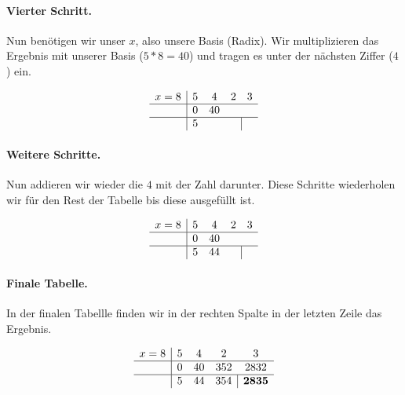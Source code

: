 \documentclass{article}
\begin{document}
\paragraph{Vierter Schritt.}

Nun benötigen wir unser $x$, also unsere Basis (Radix).
Wir multiplizieren das Ergebnis mit unserer Basis ($5 * 8 = 40$) und tragen es unter der nächsten Ziffer ($4$) ein.

\begin{align*}
    \begin{array}{c|cccc}
        x=8 & 5 & 4  & 2                     & 3 \\ \hline
            & 0 & 40 &                       &   \\ \hline
            & 5 &    & \multicolumn{1}{c|}{} &
    \end{array}
\end{align*}


\paragraph{Weitere Schritte.}
Nun addieren wir wieder die $4$ mit der Zahl darunter. Diese Schritte wiederholen wir für den Rest der Tabelle bis diese ausgefüllt ist.

\begin{align*}
    \begin{array}{c|cccc}
        x=8 & 5 & 4  & 2                     & 3 \\ \hline
            & 0 & 40 &                       &   \\ \hline
            & 5 & 44 & \multicolumn{1}{c|}{} &
    \end{array}
\end{align*}

\paragraph{Finale Tabelle.}
In der finalen Tabellle finden wir in der rechten Spalte in der letzten Zeile das Ergebnis.

\begin{align*}
    \begin{array}{c|cccc}
        x=8 & 5 & 4  & 2                        & 3             \\ \hline
            & 0 & 40 & 352                      & 2832          \\ \hline
            & 5 & 44 & \multicolumn{1}{c|}{354} & \textbf{2835}
    \end{array}
\end{align*}
\end{document}
